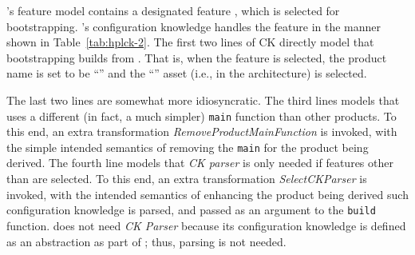 
\hpl's feature model contains a designated feature \hp, which is selected for bootstrapping. \hpl's configuration knowledge handles the feature in the manner shown in Table~\ref{tab:hplck-2}. The first two lines of CK directly model that bootstrapping builds \hpproduct{} from \hpsplasset.  That is, when the \hp{} feature is selected, the product name is set to be ``\hp'' and the ``\hp'' asset (i.e., \hpsplasset{} in the architecture) is selected. 

The last two lines are somewhat more idiosyncratic. The third lines models that \hpproduct{} uses a different (in fact, a much simpler) \texttt{main} function than other products. To this end, an extra transformation \emph{RemoveProductMainFunction} is invoked, with the simple intended semantics of removing the \texttt{main} for the product being derived. The fourth line models that \emph{CK parser} is only needed if features other than \hp{} are selected. To this end, an extra transformation \emph{SelectCKParser} is invoked, with the intended semantics of enhancing the product being derived such configuration knowledge is parsed, and passed as an argument to the \texttt{build} function. \hpproduct{} does not need \emph{CK Parser} because its configuration knowledge is defined as an abstraction as part of \hpsplasset; thus, parsing is not needed.

